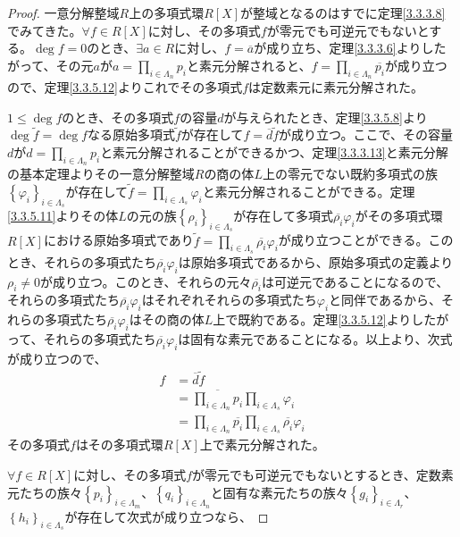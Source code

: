 \documentclass[dvipdfmx]{jsarticle}
\begin{document}
\begin{proof}
一意分解整域$R$上の多項式環$R[ X]$が整域となるのはすでに定理\ref{3.3.3.8}でみてきた。$\forall f \in R[ X]$に対し、その多項式$f$が零元でも可逆元でもないとする。$\deg f = 0$のとき、$\exists a \in R$に対し、$f = \overline{a}$が成り立ち、定理\ref{3.3.3.6}よりしたがって、その元$a$が$a = \prod_{i \in \varLambda_{n}} p_{i}$と素元分解されると、$f = \prod_{i \in \varLambda_{n}} \overline{p_{i}}$が成り立つので、定理\ref{3.3.5.12}よりこれでその多項式$f$は定数素元に素元分解された。\par
$1 \leq \deg f$のとき、その多項式$f$の容量$d$が与えられたとき、定理\ref{3.3.5.8}より$\deg\widetilde{f} = \deg f$なる原始多項式$\widetilde{f}$が存在して$f = \overline{d}\widetilde{f}$が成り立つ。ここで、その容量$d$が$d = \prod_{i \in \varLambda_{n}} p_{i}$と素元分解されることができるかつ、定理\ref{3.3.3.13}と素元分解の基本定理よりその一意分解整域$R$の商の体$L$上の零元でない既約多項式の族$\left\{ \varphi_{i} \right\}_{i \in \varLambda_{s}}$が存在して$\widetilde{f} = \prod_{i \in \varLambda_{s}} \varphi_{i}$と素元分解されることができる。定理\ref{3.3.5.11}よりその体$L$の元の族$\left\{ \rho_{i} \right\}_{i \in \varLambda_{s}}$が存在して多項式$\overline{\rho_{i}}\varphi_{i}$がその多項式環$R[ X]$における原始多項式であり$\widetilde{f} = \prod_{i \in \varLambda_{s}} {\overline{\rho_{i}}\varphi_{i}}$が成り立つことができる。このとき、それらの多項式たち$\overline{\rho_{i}}\varphi_{i}$は原始多項式であるから、原始多項式の定義より$\rho_{i} \neq 0$が成り立つ。このとき、それらの元々$\overline{\rho_{i}}$は可逆元であることになるので、それらの多項式たち$\overline{\rho_{i}}\varphi_{i}$はそれぞれそれらの多項式たち$\varphi_{i}$と同伴であるから、それらの多項式たち$\overline{\rho_{i}}\varphi_{i}$はその商の体$L$上で既約である。定理\ref{3.3.5.12}よりしたがって、それらの多項式たち$\overline{\rho_{i}}\varphi_{i}$は固有な素元であることになる。以上より、次式が成り立つので、
\begin{align*}
f &= \overline{d}\widetilde{f} \\
&= \overline{\prod_{i \in \varLambda_{n}} p_{i}}\prod_{i \in \varLambda_{s}} \varphi_{i} \\
&= \prod_{i \in \varLambda_{n}} \overline{p_{i}}\prod_{i \in \varLambda_{s}} {\overline{\rho_{i}}\varphi_{i}}
\end{align*}
その多項式$f$はその多項式環$R[ X]$上で素元分解された。\par
$\forall f \in R[ X]$に対し、その多項式$f$が零元でも可逆元でもないとするとき、定数素元たちの族々$\left\{ p_{i} \right\}_{i \in \varLambda_{m}}$、$\left\{ q_{i} \right\}_{i \in \varLambda_{n}}$と固有な素元たちの族々$\left\{ g_{i} \right\}_{i \in \varLambda_{r}}$、$\left\{ h_{i} \right\}_{i \in \varLambda_{s}}$が存在して次式が成り立つなら、

\end{proof}
\end{document}
